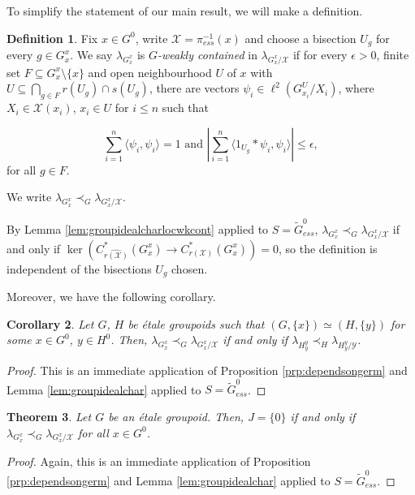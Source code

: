 \documentclass[a4paper, 12pt]{amsart}
\newtheorem{thm}{Theorem}[section]
\newtheorem{cor}[thm]{Corollary}
\theoremstyle{definition}
\newtheorem{dfn}[thm]{Definition}
\theoremstyle{remark}
\numberwithin{equation}{section}
\begin{document}
To simplify the statement of our main result, we will make a definition.

\begin{dfn}
\label{dfn:G-wkcomtain} Fix $x\in G^{0}$, write $\mathcal{X} = \pi^{-1}_{ess}(x)$ and choose a bisection $U_{g}$ for every $g\in G^{x}_{x}$. We say $\lambda_{G^{x}_{x}}$ is \emph{$G$-weakly contained} in $\lambda_{G^{x}_{x}/\mathcal{X}}$ if for every $\epsilon > 0$, finite set $F\subseteq G^{x}_{x}\setminus \{x\}$ and open neighbourhood $U$ of $x$ with $U\subseteq \bigcap_{g\in F}r(U_{g})\cap s(U_{g})$, there are vectors $\psi_{i}\in \ell^{2}(G^{U}_{x_{i}}/X_{i})$, where $X_{i}\in\mathcal{X}(x_{i})$, $x_{i}\in U$ for $i\leq n$ such that 

    $$\sum^{n}_{i=1}\langle \psi_{i}, \psi_{i}\rangle = 1\text{ and }|\sum^{n}_{i=1}\langle 1_{U_{g}}*\psi_{i},\psi_{i}\rangle|\leq\epsilon,$$ for all $g\in F$.

We write $\lambda_{G^{x}_{x}}\prec_{G}\lambda_{G^{x}_{x}/\mathcal{X}}$.
\end{dfn}

By Lemma \ref{lem:groupidealcharlocwkcont} applied to $S = \tilde{G}_{ess}^{0}$, $\lambda_{G^{x}_{x}}\prec_{G}\lambda_{G^{x}_{x}/\mathcal{X}}$ if and only if $\ker(C^{*}_{\widehat{r(\mathcal{X})}}(G^{x}_{x})\to C^{*}_{r(\mathcal{X})}(G^{x}_{x})) = 0$, so the definition is independent of the bisections $U_{g}$ chosen.

Moreover, we have the following corollary.

\begin{cor}
    Let $G$, $H$ be \'etale groupoids such that $(G, \{x\})\simeq (H, \{y\})$ for some $x\in G^{0}$, $y\in H^{0}$. Then, $\lambda_{G^{x}_{x}}\prec_{G}\lambda_{G^{x}_{x}/\mathcal{X}}$ if and only if $\lambda_{H^{y}_{y}}\prec_{H}\lambda_{H^{y}_{y}/\mathcal{Y}}$.
\end{cor}

\begin{proof}
    This is an immediate application of Proposition \ref{prp:dependsongerm} and Lemma \ref{lem:groupidealchar} applied to $S = \tilde{G}^{0}_{ess}$.
\end{proof}

\begin{thm}
\label{thm:vsingidealcharlocwkcont_ess}
    Let $G$ be an \'etale groupoid. Then, $J = \{0\}$ if and only if $\lambda_{G^{x}_{x}}\prec_{G}\lambda_{G^{x}_{x}/\mathcal{X}}$ for all $x\in G^{0}$.
\end{thm}

\begin{proof}
    Again, this is an immediate application of Proposition \ref{prp:dependsongerm} and Lemma \ref{lem:groupidealchar} applied to $S = \tilde{G}^{0}_{ess}$.
\end{proof}
\end{document}
